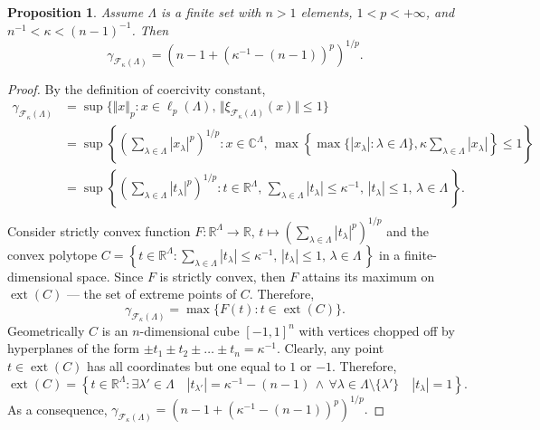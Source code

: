 \documentclass[12pt]{article}
\newtheorem{proposition}[theorem]{Proposition}
\begin{document}
\begin{proposition}\label{StdEmbdSpclCoerciv}
    Assume $\Lambda$ is a finite set with $n>1$ elements, $1<p<+\infty$, 
    and $n^{-1}<\kappa<(n-1)^{-1}$. Then
    \[
        \gamma_{\mathcal{F}_{\kappa}(\Lambda)}
        =(n-1+(\kappa^{-1}-(n-1))^p)^{1/p}.
    \]
\end{proposition}
\begin{proof}
    By the definition of coercivity constant,
    \[
    \begin{aligned}
        \gamma_{\mathcal{F}_{\kappa}(\Lambda)}
        &=\sup\{
            \Vert x\Vert_p : 
            x\in\ell_p(\Lambda),\, 
            \Vert \xi_{\mathcal{F}_{\kappa}(\Lambda)}(x)\Vert\leq 1
        \} \\
        &=\sup\left\{
            \left( \sum_{\lambda\in\Lambda} |x_\lambda|^p\right)^{1/p} : 
            x\in\mathbb{C}^\Lambda,\, 
            \max\left\{
                \max\{|x_\lambda|:\lambda\in\Lambda\},
                \kappa\sum_{\lambda\in\Lambda} |x_\lambda|
            \right\}\leq 1
        \right\} \\
        &=\sup\left\{
            \left( \sum_{\lambda\in\Lambda} |t_\lambda|^p\right)^{1/p} : 
            t\in\mathbb{R}^\Lambda,\, 
            \sum_{\lambda\in\Lambda} |t_\lambda|\leq \kappa^{-1},\,
            |t_\lambda|\leq 1,\,\lambda\in\Lambda\,
        \right\}. \\
    \end{aligned}
    \]
    Consider strictly convex function
    $
        F:
        \mathbb{R}^\Lambda\to\mathbb{R},\, 
        t\mapsto \left(\sum_{\lambda\in\Lambda}|t_\lambda|^p\right)^{1/p}
    $
    and the convex polytope
    $
        C=\left\{ 
            t\in\mathbb{R}^\Lambda : 
            \sum_{\lambda\in\Lambda} |t_\lambda|\leq \kappa^{-1},\,
            |t_\lambda|\leq 1,\,\lambda\in\Lambda\,
        \right\}
    $
    in a finite-dimensional space. Since $F$ is strictly convex, then $F$ 
    attains its maximum on $\operatorname{ext}(C)$ --- the set of extreme 
    points of $C$. Therefore,
    \[
        \gamma_{\mathcal{F}_{\kappa}(\Lambda)}=\max\{
            F(t):t\in\operatorname{ext}(C)
        \}.
    \]
    Geometrically $C$ is an $n$-dimensional cube $[-1,1]^n$ with vertices 
    chopped off by hyperplanes of the 
    form $\pm t_1\pm t_2\pm\ldots\pm t_n=\kappa^{-1}$. Clearly, any 
    point $t\in \operatorname{ext}(C)$ has all coordinates but one equal to $1$ 
    or $-1$. Therefore,
    $
        \operatorname{ext}(C)=\left\{ 
            t\in\mathbb{R}^\Lambda : 
            \exists \lambda'\in\Lambda\quad |t_{\lambda'}|=\kappa^{-1}-(n-1)\,
            \wedge\, 
            \forall \lambda\in\Lambda\setminus\{\lambda'\}\quad |t_\lambda|=1
        \right\}.
    $
    As a consequence,
    $
        \gamma_{\mathcal{F}_{\kappa}(\Lambda)}=(n-1+(\kappa^{-1}-(n-1))^p)^{1/p}.
    $
\end{proof}
\end{document}
